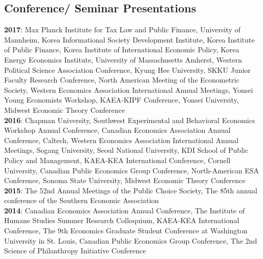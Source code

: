 \documentclass[margin]{res}
\begin{document}
\begin{resume}
\section{Conference/ Seminar Presentations}
\textbf{2017}: Max Planck Institute for Tax Law and Public Finance, University of Mannheim, Korea Informational Society Development Institute, Korea Institute of Public Finance, Korea Institute of International Economic Policy, Korea Energy Economics Institute, University of Massachusetts Amherst, Western Political Science Association Conference, Kyung Hee University, SKKU Junior Faculty Research Conference, North American Meeting of the Econometric Society, Western Economics Association International Annual Meetings, Yonsei Young Economists Workshop, KAEA-KIPF Conference, Yonsei University, Midwest Economic Theory Conference\\
\textbf{2016}: Chapman University, Southwest Experimental and Behavioral Economics Workshop Annual Conference, Canadian Economics Association Annual Conference, Caltech, Western Economics Association International Annual Meetings, Sogang University, Seoul National University, KDI School of Public Policy and Management, KAEA-KEA International Conference, Cornell University, Canadian Public Economics Group Conference, North-American ESA Conference, Sonoma State University, Midwest Economic Theory Conference\\
\textbf{2015}: The 52nd Annual Meetings of the Public Choice Society, The 85th annual conference of the Southern Economic Association\\
\textbf{2014}: Canadian Economics Association Annual Conference, The Institute of Humane Studies Summer Research Colloquium, KAEA-KEA International Conference, The 9th Economics Graduate Student Conference at Washington University in St. Louis, Canadian Public Economics Group Conference, The 2nd Science of Philanthropy Initiative Conference


\end{resume}
\end{document}
